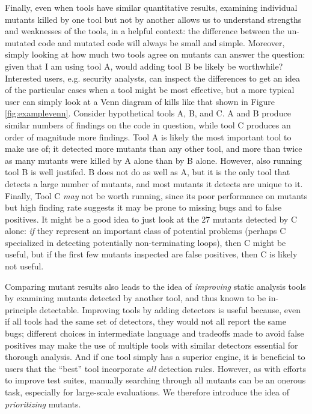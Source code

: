 Finally, even when tools have similar quantitative results, examining individual mutants killed by one tool but not by another allows us to understand strengths and weaknesses of the tools, in a helpful context: the difference between the un-mutated code and mutated code will always be small and simple.  Moreover, simply looking at how much two tools agree on mutants can answer the question: given that I am using tool A, would adding tool B be likely be worthwhile?  Interested users, e.g. security analysts, can inspect the differences to get an idea of the particular cases when a tool might be most effective, but a more typical user can simply look at a Venn diagram of kills like that shown in Figure \ref{fig:examplevenn}.  Consider hypothetical tools A, B, and C.  A and B produce similar numbers of findings on the code in question, while tool C produces an order of magnitude more findings.  Tool A is likely the most important tool to make use of; it detected more mutants than any other tool, and more than twice as many mutants were killed by A alone than by B alone.  However, also running tool B is well justifed.  B does not do as well as A, but it is the only tool that detects a large number of mutants, and most mutants it detects are unique to it.  Finally, Tool C \emph{may} not be worth running, since its poor performance on mutants but high finding rate suggests it may be prone to missing bugs and to false positives.  It might be a good idea to just look at the 27 mutants detected by C alone:  \emph{if} they represent an important class of potential problems (perhaps C specialized in detecting potentially non-terminating loops), then C might be useful, but if the first few mutants inspected are false positives, then C is likely not useful.

Comparing mutant results also leads to the idea of \emph{improving} static analysis tools by examining mutants detected by another tool, and thus known to be in-principle detectable.  Improving tools by adding detectors is useful because, even if all tools had the same set of detectors, they would not all report the same bugs; different choices in intermediate language and tradeoffs made to avoid false positives may make the use of multiple tools with similar detectors essential for thorough analysis.  And if one tool simply has a superior engine, it is beneficial to users that the ``best'' tool incorporate \emph{all} detection rules.
However, as with efforts to improve test suites, manually searching through all mutants can be an onerous task, especially for large-scale evaluations.  We therefore introduce the idea of \emph{prioritizing} mutants.

